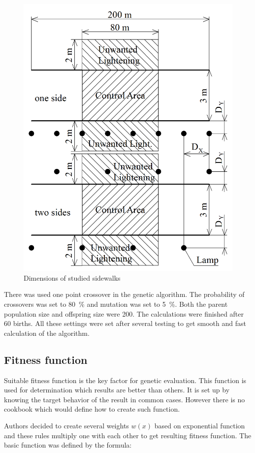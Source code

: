 \begin{figure}[htb]
  \centering
  \includegraphics[width=0.8\columnwidth]{kotyChodniku}
  \caption{Dimensions of studied sidewalks}
  \label{fig:sidewalk}
\end{figure}

There was used one point crossover in the genetic algorithm. The probability of crossovers was set to 80~\% and mutation was set to 5~\%. Both the parent population size and offspring size were 200. The calculations were finished after 60 births. All these settings were set after several testing to get smooth and fast calculation of the algorithm.

\subsection{Fitness function}
Suitable fitness function is the key factor for genetic evaluation. This function is used for determination which results are better than others. It is set up by knowing the target behavior of the result in common cases. However there is no cookbook which would define how to create such function.

Authors decided to create several weights $w\left(x\right)$ based on exponential function and these rules multiply one with each other to get resulting fitness function. The basic function was defined by the formula:

